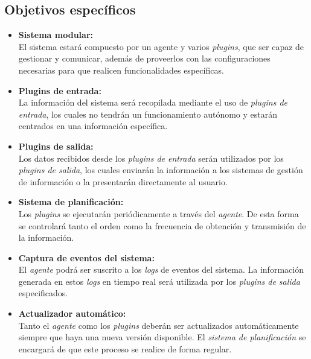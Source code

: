     \subsection{Objetivos específicos}
        \begin{itemize}
            \item \textbf{Sistema modular:} \\
                El sistema estará compuesto por un agente y varios \textit{plugins}, que ser capaz de gestionar y comunicar, además de proveerlos con las configuraciones necesarias para que realicen funcionalidades específicas.
                
            \item \textbf{Plugins de entrada:} \\
                La información del sistema será recopilada mediante el uso de \textit{plugins de entrada}, los cuales no tendrán un funcionamiento autónomo y estarán centrados en una información específica.
                
            \item \textbf{Plugins de salida:} \\
                Los datos recibidos desde los \textit{plugins de entrada} serán utilizados por los \textit{plugins de salida}, los cuales enviarán la información a los sistemas de gestión de información o la presentarán directamente al usuario.
                
            \item \textbf{Sistema de planificación:} \\
                Los \textit{plugins} se ejecutarán periódicamente a través del \textit{agente}. De esta forma se controlará tanto el orden como la frecuencia de obtención y transmisión de la información.
                  
            \item \textbf{Captura de eventos del sistema:} \\
                El \textit{agente} podrá ser suscrito a los \textit{logs} de eventos del sistema. La información generada en estos \textit{logs} en tiempo real será utilizada por los \textit{plugins de salida} especificados.
            
            \item \textbf{Actualizador automático:} \\
                Tanto el \textit{agente} como los \textit{plugins} deberán ser actualizados automáticamente siempre que haya una nueva versión disponible. El \textit{sistema de planificación} se encargará de que este proceso se realice de forma regular.
                

\end{itemize}
